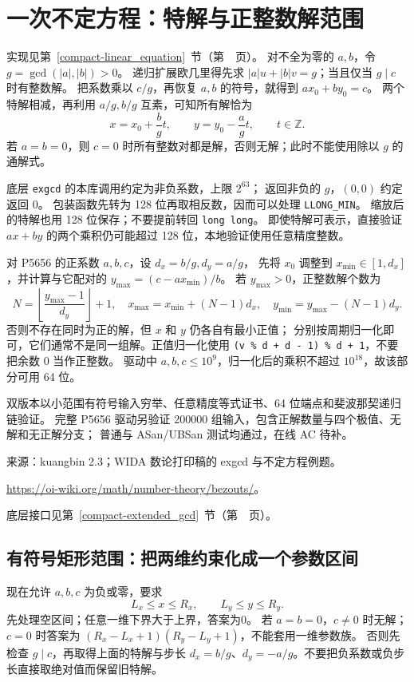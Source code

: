\section{一次不定方程：特解与正整数解范围}\label{knowledge-diophantine-bounds}
实现见第~\ref{compact-linear_equation}~节（第~\pageref{compact-linear_equation}~页）。
对不全为零的 $a,b$，令 $g=\gcd(|a|,|b|)>0$。
递归扩展欧几里得先求 $|a|u+|b|v=g$；当且仅当 $g\mid c$ 时有整数解。
把系数乘以 $c/g$，再恢复 $a,b$ 的符号，就得到 $ax_0+by_0=c$。
两个特解相减，再利用 $a/g,b/g$ 互素，可知所有解恰为
\[
x=x_0+\frac bg t,\qquad y=y_0-\frac ag t,\qquad t\in\mathbb Z.
\]
若 $a=b=0$，则 $c=0$ 时所有整数对都是解，否则无解；此时不能使用除以 $g$ 的通解式。

底层 \texttt{exgcd} 的本库调用约定为非负系数，上限 $2^{63}$；
返回非负的 $g$，$(0,0)$ 约定返回 0。
包装函数先转为 128 位再取相反数，因而可以处理 \texttt{LLONG\_MIN}。
缩放后的特解也用 128 位保存；不要提前转回 \texttt{long long}。
即使特解可表示，直接验证 $ax+by$ 的两个乘积仍可能超过 128 位，本地验证使用任意精度整数。

对 P5656 的正系数 $a,b,c$，设 $d_x=b/g,d_y=a/g$，
先将 $x_0$ 调整到 $x_{\min}\in[1,d_x]$，并计算与它配对的
$y_{\max}=(c-ax_{\min})/b$。
若 $y_{\max}>0$，正整数解个数为
\[
N=\left\lfloor\frac{y_{\max}-1}{d_y}\right\rfloor+1,
\quad x_{\max}=x_{\min}+(N-1)d_x,
\quad y_{\min}=y_{\max}-(N-1)d_y.
\]
否则不存在同时为正的解，但 $x$ 和 $y$ 仍各自有最小正值；
分别按周期归一化即可，它们通常不是同一组解。正值归一化使用
\texttt{(v \% d + d - 1) \% d + 1}，不要把余数 0 当作正整数。
驱动中 $a,b,c\le10^9$，归一化后的乘积不超过 $10^{18}$，故该部分可用 64 位。

双版本以小范围有符号输入穷举、任意精度等式证书、64 位端点和斐波那契递归链验证。
完整 P5656 驱动另验证 200000 组输入，包含正解数量与四个极值、无解和无正解分支；
普通与 ASan/UBSan 测试均通过，在线 AC 待补。

来源：kuangbin 2.3；WIDA 数论打印稿的 exgcd 与不定方程例题。

\url{https://oi-wiki.org/math/number-theory/bezouts/}。

底层接口见第~\ref{compact-extended_gcd}~节（第~\pageref{compact-extended_gcd}~页）。

\newpage
\subsection{有符号矩形范围：把两维约束化成一个参数区间}
现在允许 $a,b,c$ 为负或零，要求
\[
L_x\le x\le R_x,\qquad L_y\le y\le R_y.
\]
先处理空区间；任意一维下界大于上界，答案为0。
若 $a=b=0$，$c\ne0$ 时无解；$c=0$ 时答案为
$(R_x-L_x+1)(R_y-L_y+1)$，不能套用一维参数族。
否则先检查 $g\mid c$，再取得上面的特解与步长
$d_x=b/g$、$d_y=-a/g$。不要把负系数或负步长直接取绝对值而保留旧特解。

